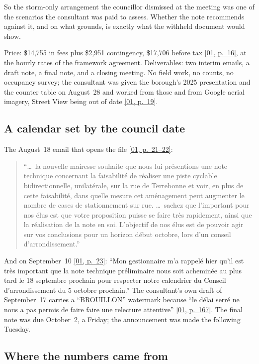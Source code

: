 \documentclass[11pt,letterpaper]{article}
\newcommand{\pagesurl}{https://openmobilitydata.github.io/Terrebonne-access-requests}
\newcommand{\pgl}[3]{\href{\pagesurl/\csname bundle#1\endcsname\#page=#2}{\textsf{\small[#1, p.~#3]}}}
\newcommand{\pg}[2]{\pgl{#1}{#2}{#2}}
\newcommand{\quot}[1]{\begin{quote}\small #1\end{quote}}
\begin{document}
So the storm-only arrangement the councillor dismissed at the meeting was one
of the scenarios the consultant was paid to assess. Whether the note
recommends against it, and on what grounds, is exactly what the withheld
document would show.

Price: \$14{,}755 in fees plus \$2{,}951 contingency, \$17{,}706 before tax
\pg{01}{16}, at the hourly rates of the framework agreement. Deliverables:
two interim emails, a draft note, a final note, and a closing meeting. No
field work, no counts, no occupancy survey; the consultant was given the
borough's 2025 presentation and the counter table on August~28 and worked
from those and from Google aerial imagery, Street View being out of date
\pg{01}{19}.

\subsection{A calendar set by the council date}

The August~18 email that opens the file \pgl{01}{21}{21--22}:

\quot{``\ldots\ la nouvelle mairesse souhaite que nous lui pr\'esentions une note
technique concernant la faisabilit\'e de r\'ealiser une piste cyclable
bidirectionnelle, unilat\'erale, sur la rue de Terrebonne et voir, en plus de
cette faisabilit\'e, dans quelle mesure cet am\'enagement peut augmenter le
nombre de cases de stationnement sur rue. \ldots\ sachez que l'important
pour nos \'elus est que votre proposition puisse se faire tr\`es rapidement,
ainsi que la r\'ealisation de la note en soi. L'objectif de nos \'elus est de
pouvoir agir sur vos conclusions pour un horizon d\'ebut octobre, lors d'un
conseil d'arrondissement.''}

And on September~10 \pg{01}{23}: ``Mon gestionnaire m'a rappel\'e hier qu'il
est tr\`es important que la note technique pr\'eliminaire nous soit achemin\'ee
au plus tard le 18 septembre prochain pour respecter notre calendrier du
Conseil d'arrondissement du 5 octobre prochain.'' The consultant's own draft
of September~17 carries a ``BROUILLON'' watermark because ``le d\'elai serr\'e
ne nous a pas permis de faire faire une relecture attentive'' \pg{01}{167}.
The final note was due October~2, a Friday; the announcement was made the
following Tuesday.

\subsection{Where the numbers came from}
\end{document}
